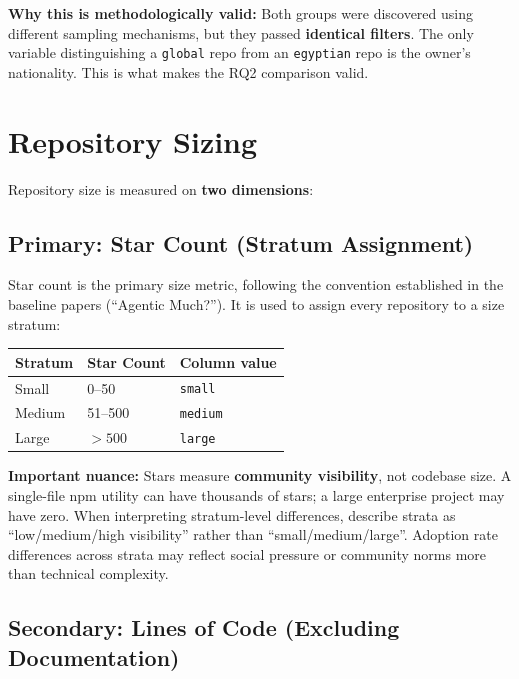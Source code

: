 \documentclass[11pt,a4paper]{article}
\begin{document}
\textbf{Why this is methodologically valid:} Both groups were discovered using different sampling mechanisms, but they passed \textbf{identical filters}. The only variable distinguishing a \texttt{global} repo from an \texttt{egyptian} repo is the owner's nationality. This is what makes the RQ2 comparison valid.

\section{Repository Sizing}

Repository size is measured on \textbf{two dimensions}:

\subsection{Primary: Star Count (Stratum Assignment)}

Star count is the primary size metric, following the convention established in the baseline papers (``Agentic Much?''). It is used to assign every repository to a size stratum:

\begin{center}
\begin{tabular}{lll}
\toprule
\textbf{Stratum} & \textbf{Star Count} & \textbf{Column value} \\
\midrule
Small & 0--50 & \texttt{small} \\
Medium & 51--500 & \texttt{medium} \\
Large & $>500$ & \texttt{large} \\
\bottomrule
\end{tabular}
\end{center}

\begin{warnbox}
\textbf{Important nuance:} Stars measure \textbf{community visibility}, not codebase size. A single-file npm utility can have thousands of stars; a large enterprise project may have zero. When interpreting stratum-level differences, describe strata as ``low/medium/high visibility'' rather than ``small/medium/large''. Adoption rate differences across strata may reflect social pressure or community norms more than technical complexity.
\end{warnbox}

\subsection{Secondary: Lines of Code (Excluding Documentation)}
\end{document}
